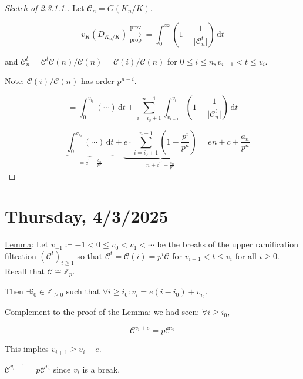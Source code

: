 \documentclass{article}
\theoremstyle{definition}
\numberwithin{theorem}{subsection}
\begin{document}
    \begin{proof}
        [Sketch of 2.3.1.1.]

        Let \(\mathscr{C}_n = G(K_n / K)\). 

        \[
            v_K(D_{K_n / K}) \xrightarrow[\text{prop}]{\text{prev}}= \int_{0}^{\infty} \left( 1 - \frac{1}{\vert \mathscr{C}_n^t \vert} \right)  \,\mathrm{d}t
        \]

        and \(\mathscr{C}_n^t = \mathscr{C}^t \mathscr{C}(n) / \mathscr{C}(n) = \mathscr{C}(i) / \mathscr{C}(n)\) for \(0 \leq i \leq n, v_{i-1} < t \leq v_i\).

        Note: \(\mathscr{C}(i) / \mathscr{C}(n)\) has order \(p^{n-i}\).

        \[
            =\int_{0}^{v_{i_0}} \left( \cdots \right)  \,\mathrm{d}t + \sum_{i=i_0 + 1}^{n-1} \int_{v_{i-1}}^{v_i} \left( 1 - \frac{1}{\vert \mathscr{C}_n^t \vert } \right)  \,\mathrm{d}t 
        \]

        \[
            = \underbrace{\int_{0}^{v_{i_0}} \left( \cdots \right)  \,\mathrm{d}t }_{= c^{\prime} + \frac{b_n}{p^n}} + \underbrace{e \cdot \sum_{i=i_0 + 1}^{n-1} \left( 1 - \frac{p^i}{p^n} \right)}_{n + c^{\prime\prime} + \frac{a_n}{p^n}} = en + c + \frac{a_n}{p^n}
        \]

    \end{proof}

    \section*{Thursday, 4/3/2025}
    
    \underline{Lemma}: Let \(v_{-1} \coloneqq -1 < 0 \leq v_0 < v_1 < \cdots\) be the breaks of the upper ramification filtration \((\mathscr{C}^t)_{t\geq 1}\) so that \(\mathscr{C}^t = \mathscr{C}(i) = p^i \mathscr{C}\) for \(v_{i-1} < t \leq v_i\) for all \(i \geq 0\). Recall that \(\mathscr{C} \cong \mathbb{Z}_p\).

    Then \(\exists i_0 \in \mathbb{Z}_{\geq 0}\) such that \(\forall i \geq i_0: v_i = e(i-i_0) + v_{i_0}\).

    Complement to the proof of the Lemma: we had seen: \(\forall i \geq i_0,\) 

    \[
        \mathscr{C}^{v_i + e} = p \mathscr{C}^{v_i}
    \]

    This implies \(v_{i+1} \geq v_i + e\).

    \(\mathscr{C}^{v_i + 1} = p \mathscr{C}^{v_i}\) since \(v_i\) is a break.
\end{document}
